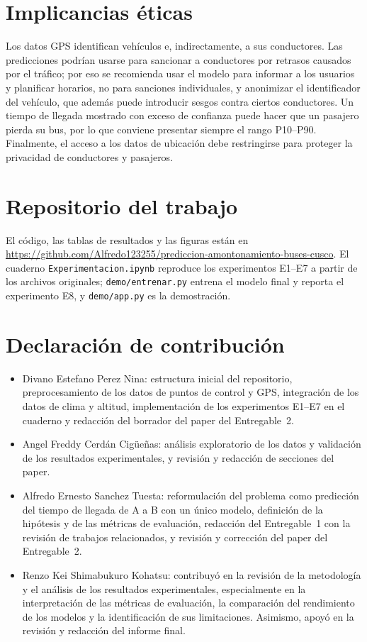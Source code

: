 \documentclass[conference,a4paper]{IEEEtran}
\begin{document}
\section{Implicancias éticas}
Los datos GPS identifican vehículos e, indirectamente, a sus conductores. Las predicciones podrían usarse para sancionar a conductores por retrasos causados por el tráfico; por eso se recomienda usar el modelo para informar a los usuarios y planificar horarios, no para sanciones individuales, y anonimizar el identificador del vehículo, que además puede introducir sesgos contra ciertos conductores. Un tiempo de llegada mostrado con exceso de confianza puede hacer que un pasajero pierda su bus, por lo que conviene presentar siempre el rango P10--P90. Finalmente, el acceso a los datos de ubicación debe restringirse para proteger la privacidad de conductores y pasajeros.

\section{Repositorio del trabajo}
El código, las tablas de resultados y las figuras están en \url{https://github.com/Alfredo123255/prediccion-amontonamiento-buses-cusco}. El cuaderno \texttt{Experimentacion.ipynb} reproduce los experimentos E1--E7 a partir de los archivos originales; \texttt{demo/entrenar.py} entrena el modelo final y reporta el experimento E8, y \texttt{demo/app.py} es la demostración.

\section{Declaración de contribución}
\begin{itemize}
\item Divano Estefano Perez Nina: estructura inicial del repositorio, preprocesamiento de los datos de puntos de control y GPS, integración de los datos de clima y altitud, implementación de los experimentos E1--E7 en el cuaderno y redacción del borrador del paper del Entregable~2.
\item Angel Freddy Cerdán Cigüeñas: análisis exploratorio de los datos y validación de los resultados experimentales, y revisión y redacción de secciones del paper.
\item Alfredo Ernesto Sanchez Tuesta: reformulación del problema como predicción del tiempo de llegada de A a B con un único modelo, definición de la hipótesis y de las métricas de evaluación, redacción del Entregable~1 con la revisión de trabajos relacionados, y revisión y corrección del paper del Entregable~2.
\item Renzo Kei Shimabukuro Kohatsu: contribuyó en la revisión de la metodología y el análisis de los resultados experimentales, especialmente en la interpretación de las métricas de evaluación, la comparación del rendimiento de los modelos y la identificación de sus limitaciones. Asimismo, apoyó en la revisión y redacción del informe final.
\end{itemize}
\end{document}
